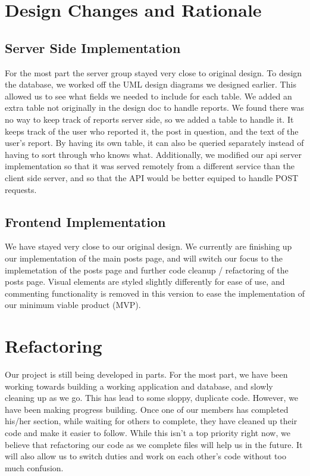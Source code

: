 \documentclass[12pt]{article}
\begin{document}
\section{Design Changes and Rationale}
\subsection{Server Side Implementation}
For the most part the server group stayed very close to original design.  To
design the database, we worked off the UML design diagrams we designed earlier.
This allowed us to see what fields we needed to include for each table.  We
added an extra table not originally in the design doc to handle reports.  We
found there was no way to keep track of reports server side, so we added a table
to handle it.  It keeps track of the user who reported it, the post in question,
and the text of the user’s report.  By having its own table, it can also be
queried separately instead of having to sort through who knows what.
Additionally, we modified our api server implementation so that it was served
remotely from a different service than the client side server, and so that the
API would be better equiped to handle POST requests.
\subsection{Frontend Implementation}
We have stayed very close to our original design. We currently are finishing up
our implementation of the main posts page, and will switch our focus to the
implemetation of the posts page and further code cleanup / refactoring of the
posts page. Visual elements are styled slightly differently for ease of use, and
commenting functionality is removed in this version to ease the implementation
of our minimum viable product (MVP).

\section{Refactoring}

Our project is still being developed in parts. For the most part, we have
been working towards building a working application and database, and slowly
cleaning up as we go. This has lead to some sloppy, duplicate code. However,
we have been making progress building. Once one of our members has completed
his/her section, while waiting for others to complete, they have cleaned up
their code and make it easier to follow. While this isn’t a top priority
right now, we believe that refactoring our code as we complete files will
help us in the future. It will also allow us to switch duties and work on
each other's code without too much confusion.
\end{document}
